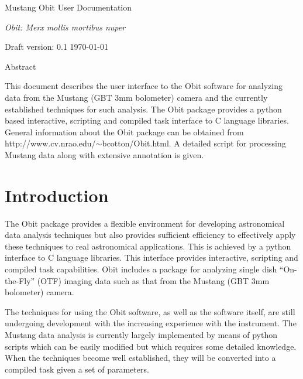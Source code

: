\documentclass[11pt]{report}
\begin{document}
\setcounter{chapter}{1}

\topskip 1.5in
\centerline{\ttlfont Mustang Obit User Documentation }
\vskip 1cm
\centerline{\LARGE\it Obit: Merx mollis mortibus nuper}
\vskip 3cm
\centerline{\secfont Draft version: 0.1 \today}
\vskip 1cm

\centerline{\secfont Abstract}
This document describes the user interface to the Obit software for
analyzing data from the Mustang (GBT 3mm bolometer) camera and the
currently established techniques for such analysis.
The Obit package provides a python based interactive, scripting and
compiled task interface to C language libraries.
General information about the Obit package can be obtained from 
http://www.cv.nrao.edu/$\sim$bcotton/Obit.html. 
A detailed script for processing Mustang data along with extensive
annotation is given.

\clearpage
\topskip 0in
\newpage 
\tableofcontents
\newpage

\section {Introduction}
The Obit package provides a flexible environment for developing
astronomical data analysis techniques but also provides sufficient
efficiency to effectively apply these techniques to real astronomical
applications.
This is achieved by a python interface to C language libraries.
This interface provides interactive, scripting and compiled task
capabilities. 
Obit includes a package for analyzing single dish ``On-the-Fly'' (OTF)
imaging data such as that from the Mustang (GBT 3mm bolometer) camera.

The techniques for using the Obit software, as well as the software
itself, are still undergoing development with the increasing
experience with the instrument.
The Mustang data analysis is currently largely implemented by means of
python scripts which can be easily modified but which requires some
detailed knowledge.
When the techniques become well established, they will be converted
into a compiled task given a set of parameters.
\end{document}
